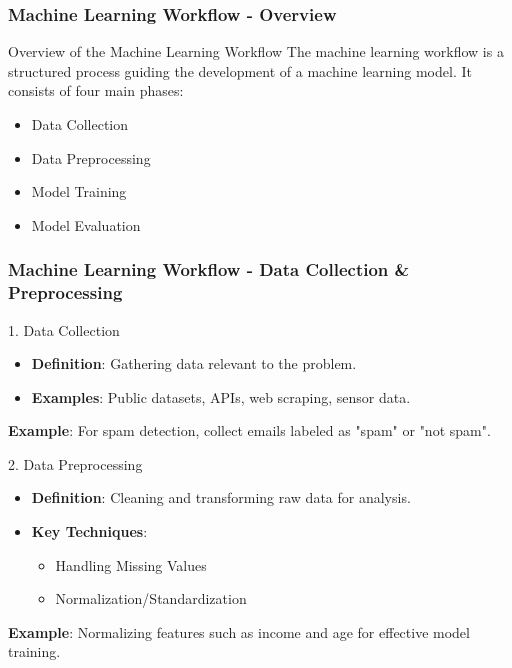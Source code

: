 \documentclass[aspectratio=169]{beamer}
\begin{document}
\begin{frame}[fragile]
    \frametitle{Machine Learning Workflow - Overview}
    \begin{block}{Overview of the Machine Learning Workflow}
        The machine learning workflow is a structured process guiding the development of a machine learning model. 
        It consists of four main phases:
        \begin{itemize}
            \item Data Collection
            \item Data Preprocessing
            \item Model Training
            \item Model Evaluation
        \end{itemize}
    \end{block}
\end{frame}

\begin{frame}[fragile]
    \frametitle{Machine Learning Workflow - Data Collection & Preprocessing}
    \begin{block}{1. Data Collection}
        \begin{itemize}
            \item \textbf{Definition}: Gathering data relevant to the problem.
            \item \textbf{Examples}: Public datasets, APIs, web scraping, sensor data.
        \end{itemize}
        \textbf{Example}: For spam detection, collect emails labeled as "spam" or "not spam".
    \end{block}

    \begin{block}{2. Data Preprocessing}
        \begin{itemize}
            \item \textbf{Definition}: Cleaning and transforming raw data for analysis.
            \item \textbf{Key Techniques}:
            \begin{itemize}
                \item Handling Missing Values
                \item Normalization/Standardization
            \end{itemize}
        \end{itemize}
        \textbf{Example}: Normalizing features such as income and age for effective model training.
    \end{block}
\end{frame}
\end{document}
